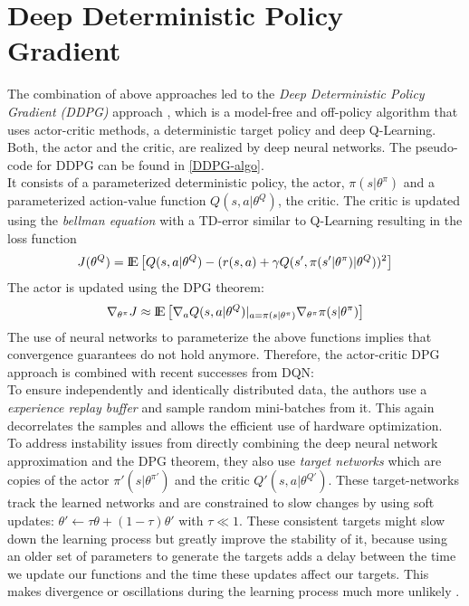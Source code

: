 \section{Deep Deterministic Policy Gradient}
\label{sec:DDPG}
The combination of above approaches led to the \textit{Deep Deterministic Policy Gradient (DDPG)} approach \citep{lillicrap2015continuous}, which is a model-free and off-policy algorithm that uses actor-critic methods, a deterministic target policy and deep Q-Learning. Both, the actor and the critic, are realized by deep neural networks. The pseudo-code for DDPG can be found in \ref{DDPG-algo}.\\
It consists of a parameterized deterministic policy, the actor, $\pi(s|\theta^\pi)$ and a parameterized action-value function $Q(s,a|\theta^Q)$, the critic. The critic is updated using the \textit{bellman equation} with a TD-error similar to Q-Learning \citep{watkins1992q} resulting in the loss function
\[
J(\theta^Q)={\rm I\!E}\left[
Q(s,a|\theta^Q)-(r(s,a) + \gamma Q(s', \pi(s'|\theta^\pi)|\theta^{Q}))^2\right]
\]
The actor is updated using the DPG theorem:
\[
\nabla_{\theta^\pi}J\approx {\rm I\!E}\left[\nabla_aQ(s,a|\theta^Q)|_{a=\pi(s|\theta^\pi)} \nabla_{\theta^\pi}\pi(s|\theta^\pi)\right]
\]
The use of neural networks to parameterize the above functions implies that convergence guarantees do not hold anymore. Therefore, the actor-critic DPG approach is combined with recent successes from DQN:\\
To ensure independently and identically distributed data, the authors use a \textit{experience replay buffer} and sample random mini-batches from it. This again decorrelates the samples and allows the efficient use of hardware optimization.\\
To address instability issues from directly combining the deep neural network approximation and the DPG theorem, they also use \textit{target networks} which are copies of the actor $\pi'(s|\theta^{\pi'})$ and the critic $Q'(s,a|\theta^{Q'})$. These target-networks track the learned networks and are constrained to slow changes by using soft updates: $\theta' \leftarrow \tau\theta + (1-\tau)\theta'$ with $\tau \ll 1$. These consistent targets might slow down the learning process but greatly improve the stability of it, because using an older set of parameters to generate the targets adds a delay between the time we update our functions and the time these updates affect our targets. This makes divergence or oscillations during the learning process much more unlikely \citep{mnih2015human}.\\
